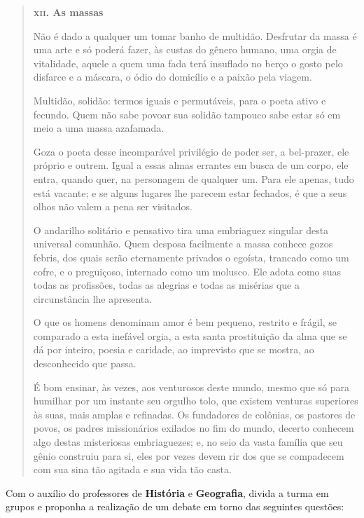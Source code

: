 \documentclass[12pt]{extarticle}
\begin{document}
\begin{quote}
\dotfill

\textbf{\textsc{xii.} As massas}\medskip

Não é dado a qualquer um tomar banho de multidão. Desfrutar da massa é uma
arte e só poderá fazer, às custas do gênero humano, uma orgia de
vitalidade, aquele a quem uma fada terá insuflado no berço o gosto
pelo disfarce e a máscara, o ódio do domicílio e a paixão pela
viagem.

Multidão, solidão: termos iguais e permutáveis, para o poeta ativo e
fecundo. Quem não sabe povoar sua solidão tampouco sabe estar só em
meio a uma massa azafamada.

Goza o poeta desse incomparável privilégio de poder ser, a bel-prazer,
ele próprio e outrem. Igual a essas almas errantes em busca de um corpo,
ele entra, quando quer, na personagem de qualquer um. Para ele apenas, tudo
está vacante; e se alguns lugares lhe parecem estar fechados, é que a
seus olhos não valem a pena ser visitados.

O andarilho solitário e pensativo tira uma embriaguez singular desta
universal comunhão. Quem desposa facilmente a massa conhece gozos
febris, dos quais serão eternamente privados o egoísta, trancado como
um cofre, e o preguiçoso, internado como um molusco. Ele adota como
suas todas as profissões, todas as alegrias e todas as misérias que a
circunstância lhe apresenta.

O que os homens denominam amor é bem pequeno, restrito e frágil, se 
comparado a esta inefável orgia, a esta santa prostituição da alma
que se dá por inteiro, poesia e caridade, ao imprevisto que se mostra, ao
desconhecido que passa.

É bom ensinar, às vezes, aos venturosos deste mundo, mesmo que só para
humilhar por um instante seu orgulho tolo, que existem venturas
superiores às suas, mais amplas e refinadas. Os fundadores de colônias,
os pastores de povos, os padres missionários exilados no fim do mundo,
decerto conhecem algo destas misteriosas embriaguezes; e, no seio da
vasta família que seu gênio construiu para si, eles por vezes devem rir
dos que se compadecem com sua sina tão agitada e sua vida tão
casta.

\dotfill
\end{quote}

Com o auxílio do professores de \textbf{História} e \textbf{Geografia}, divida a turma em grupos e proponha a realização de um debate em torno das seguintes questões:
\end{document}
